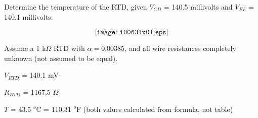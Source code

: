 

Determine the temperature of the RTD, given $V_{CD}$ = 140.5 millivolts and $V_{EF}$ = 140.1 millivolts:

$$\texttt{[image: i00631x01.eps]}$$

Assume a 1 k$\Omega$ RTD with $\alpha = 0.00385$, and all wire resistances completely unknown (not assumed to be equal).







$V_{RTD}$ = 140.1 mV 

\vskip 10pt

$R_{RTD}$ = 1167.5 $\Omega$

\vskip 10pt

$T$ = 43.5 $^{o}$C = 110.31 $^{o}$F (both values calculated from formula, not table)











